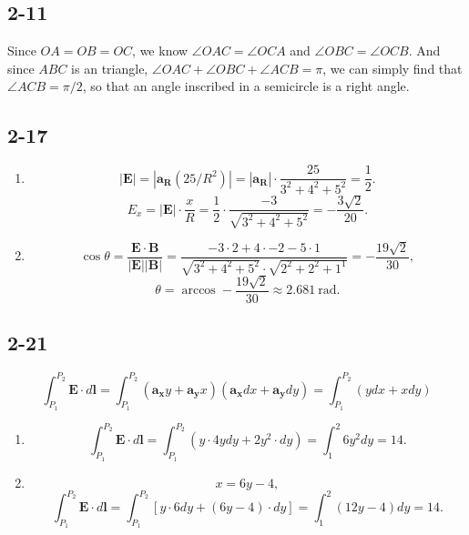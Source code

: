 \documentclass[6pt,a4paper]{article}
\begin{document}
\subsection{2-11}
\begin{center}
\end{center}

Since $OA=OB=OC$, we know $\angle OAC=\angle OCA$ and $\angle OBC=\angle OCB$. And since $ABC$ is an triangle, $\angle OAC+\angle OBC+\angle ACB=\pi$, we can simply find that $\angle ACB=\pi/2$, so that an angle inscribed in a semicircle is a right angle.

\subsection{2-17}
\begin{enumerate}[label=\alph*)]
\item 
$$|\mathbf{E}|=|\mathbf{a_R}(25/R^2)|=|\mathbf{a_R}|\cdot\frac{25}{3^2+4^2+5^2}=\frac{1}{2}.$$
$$E_x=|\mathbf{E}|\cdot\frac{x}{R}=\frac{1}{2}\cdot\frac{-3}{\sqrt{3^2+4^2+5^2}}=-\frac{3\sqrt{2}}{20}.$$
\item
$$\cos\theta=\frac{\mathbf{E}\cdot\mathbf{B}}{|\mathbf{E}||\mathbf{B}|}=\frac{-3\cdot2+4\cdot-2-5\cdot1}{\sqrt{3^2+4^2+5^2}\cdot\sqrt{2^2+2^2+1^1}}=-\frac{19\sqrt{2}}{30},$$
$$\theta=\arccos-\frac{19\sqrt{2}}{30}\approx \SI{2.681}{\radian}.$$
\end{enumerate}

\subsection{2-21}
$$\int_{P_1}^{P_2}\mathbf{E}\cdot d\mathbf{l}=\int_{P_1}^{P_2}(\mathbf{a_x}y+\mathbf{a_y}x)(\mathbf{a_x}dx+\mathbf{a_y}dy)=\int_{P_1}^{P_2}(ydx+xdy)$$
\begin{enumerate}[label=\alph*)]
\item
$$\int_{P_1}^{P_2}\mathbf{E}\cdot d\mathbf{l}=\int_{P_1}^{P_2}(y\cdot4ydy+2y^2\cdot dy)=\int_1^2 6y^2dy=14.$$
\item
$$x=6y-4,$$
$$\int_{P_1}^{P_2}\mathbf{E}\cdot d\mathbf{l}=\int_{P_1}^{P_2}[y\cdot6dy+(6y-4)\cdot dy]=\int_1^2 (12y-4)dy=14.$$
\end{enumerate}
\end{document}
